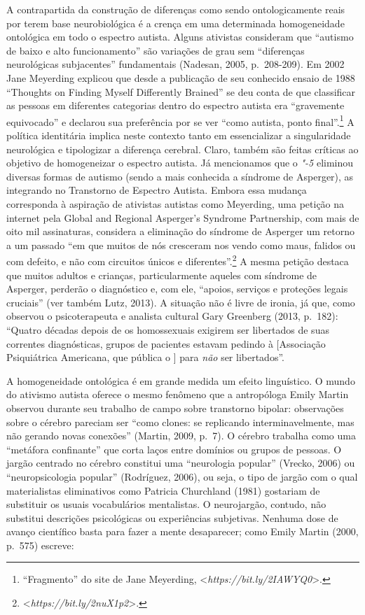 A contrapartida da construção de diferenças como sendo ontologicamente
reais por terem base neurobiológica é a crença em uma determinada
homogeneidade ontológica em todo o espectro autista. Alguns ativistas
consideram que ``autismo de baixo e alto funcionamento'' são variações
de grau sem ``diferenças neurológicas subjacentes'' fundamentais
(Nadesan, 2005, p.~208-209). Em 2002 Jane Meyerding explicou que desde a
publicação de seu conhecido ensaio de 1988 ``Thoughts on Finding Myself
Differently Brained'' se deu conta de que classificar as pessoas em
diferentes categorias dentro do espectro autista era ``gravemente
equivocado'' e declarou sua preferência por se ver ``como autista, ponto
final''.\footnote[29]{``Fragmento'' do site de Jane Meyerding,
\textless{}\emph{https://bit.ly/2IAWYQ0}\textgreater{}.} A política identitária implica neste
contexto tanto em essencializar a singularidade neurológica e
tipologizar a diferença cerebral. Claro, também são feitas críticas ao
objetivo de homogeneizar o espectro autista. Já mencionamos que o
\emph{"-5} eliminou diversas formas de autismo (sendo a mais conhecida
a síndrome de Asperger), as integrando no Transtorno de Espectro
Autista. Embora essa mudança corresponda à aspiração de ativistas
autistas como Meyerding, uma petição na internet pela Global and
Regional Asperger's Syndrome Partnership, com mais de oito mil
assinaturas, considera a eliminação do síndrome de Asperger um retorno a
um passado ``em que muitos de nós cresceram nos vendo como maus, falidos
ou com defeito, e não com circuitos únicos e
diferentes''.\footnote[30]{\textless{}\emph{https://bit.ly/2nuX1p2}\textgreater{}.} A mesma petição destaca que muitos
adultos e crianças, particularmente aqueles com síndrome de Asperger,
perderão o diagnóstico e, com ele, ``apoios, serviços e proteções legais
cruciais'' (ver também Lutz, 2013). A situação não é livre de ironia, já
que, como observou o psicoterapeuta e analista cultural Gary Greenberg
(2013, p.~182): ``Quatro décadas depois de os homossexuais exigirem ser
libertados de suas correntes diagnósticas, grupos de pacientes estavam
pedindo à  {[}Associação Psiquiátrica Americana, que pública o
\emph{}{]} para \emph{não} ser libertados''.

A homogeneidade ontológica é em grande medida um efeito linguístico. O
mundo do ativismo autista oferece o mesmo fenômeno que a antropóloga
Emily Martin observou durante seu trabalho de campo sobre transtorno
bipolar: observações sobre o cérebro pareciam ser ``como clones: se
replicando interminavelmente, mas não gerando novas conexões'' (Martin,
2009, p.~7). O cérebro trabalha como uma ``metáfora confinante'' que
corta laços entre domínios ou grupos de pessoas. O jargão centrado no
cérebro constitui uma ``neurologia popular'' (Vrecko, 2006) ou
``neuropsicologia popular'' (Rodríguez, 2006), ou seja, o tipo de jargão
com o qual materialistas eliminativos como Patricia Churchland (1981)
gostariam de substituir os usuais vocabulários mentalistas. O
neurojargão, contudo, não substitui descrições psicológicas ou
experiências subjetivas. Nenhuma dose de avanço científico basta para
fazer a mente desaparecer; como Emily Martin (2000, p.~575) escreve:

